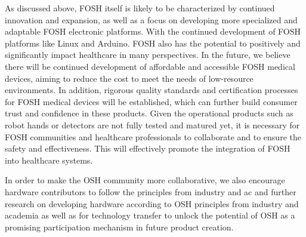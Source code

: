 \documentclass[final-report.tex]{subfiles}
\begin{document}

As discussed above, FOSH itself is likely to be characterized by continued innovation and expansion, as well as a focus on developing more specialized and adaptable FOSH electronic platforms. With the continued development of FOSH platforms like Linux and Arduino. FOSH also has the potential to positively and significantly impact healthcare in many perspectives. In the future, we believe there will be continued development of affordable and accessible FOSH medical devices, aiming to reduce the cost to meet the needs of low-resource environments. In addition, rigorous quality standards and certification processes for FOSH medical devices will be established, which can further build consumer trust and confidence in these products. Given the operational products such as robot hands or detectors are not fully tested and matured yet, it is necessary for FOSH communities and healthcare professionals to collaborate and to ensure the safety and effectiveness. This will effectively promote the integration of FOSH into healthcare systems.




In order to make the OSH community more collaborative, we also encourage hardware contributors to follow the principles from industry and ac and further research on developing hardware according to OSH
principles from industry and academia as well as for technology transfer to unlock the potential of OSH as a promising participation mechanism in future product creation. 
\end{document}
